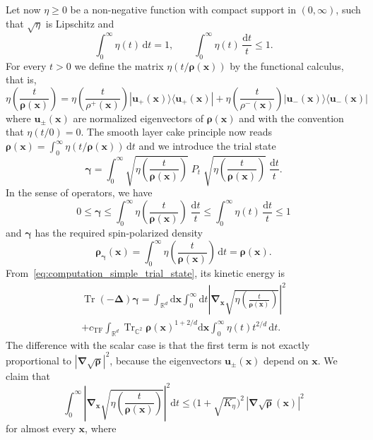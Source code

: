 \documentclass[final,reqno]{amsart}
\theoremstyle{remark}
\renewcommand{\le}{\leqslant}
\renewcommand{\ge}{\geqslant}
\DeclareMathOperator{\Tr}{Tr}
\newcommand{\Trs}{\Tr_{\CC^2}}
\newcommand{\RR}{\mathbb{R}}
\newcommand{\CC}{\mathbb{C}}
\newcommand{\TF}{\mathrm{TF}}
\newcommand{\lapl}{\bm{\Delta}}
\newcommand{\grad}{\bm{\nabla}}
\newcommand{\dd}{\mathrm{d}}
\begin{document}
Let now $\eta\ge0$ be a non-negative function with compact support in $(0,\infty)$, such that $\sqrt\eta$ is Lipschitz and
\begin{equation}\label{eq:cond_eta}
\int_0^\infty\eta(t)\,\dd t=1,\qquad \int_0^\infty\eta(t)\,\frac{\dd t}{t}\le1.
\end{equation}
For every $t>0$ we define the matrix $\eta(t/\bm{\rho}(\mathbf{x}))$ by the functional calculus, that is,
$$
\eta\left(\frac{t}{\bm{\rho}(\mathbf{x})}\right)=\eta\left(\frac{t}{\rho^+(\mathbf{x})}\right)|\mathbf{u}_+(\mathbf{x})\rangle\langle \mathbf{u}_+(\mathbf{x})|+\eta\left(\frac{t}{\rho^-(\mathbf{x})}\right)|\mathbf{u}_-(\mathbf{x})\rangle\langle \mathbf{u}_-(\mathbf{x})|
$$
where $\mathbf{u}_\pm(\mathbf{x})$ are normalized eigenvectors of $\bm{\rho}(\mathbf{x})$ and with the convention that $\eta(t/0)=0$. The smooth layer cake principle now reads $\bm{\rho}(\mathbf{x})=\int_0^\infty \eta(t/\bm{\rho}(\mathbf{x}))\,\dd t$ and we introduce the trial state
$$
\bm{\gamma}=\int_0^\infty  \sqrt{\eta\left(\frac{t}{\bm{\rho}(\mathbf{x})}\right)}\;P_t\;\sqrt{\eta\left(\frac{t}{\bm{\rho}(\mathbf{x})}\right)}\;\frac{\dd t}{t}.
$$
In the sense of operators, we have
$$
0\le \bm{\gamma}\le \int_0^\infty  \eta\left(\frac{t}{\bm{\rho}(\mathbf{x})}\right)\;\frac{\dd t}{t}\le\int_0^\infty\eta(t)\,\frac{\dd t}{t}\le1
$$
and $\bm{\gamma}$ has the required spin-polarized density
$$
\bm{\rho}_{\bm{\gamma}}(\mathbf{x})=\int_0^\infty  \eta\left(\frac{t}{\bm{\rho}(\mathbf{x})}\right)\,\dd t=\bm{\rho}(\mathbf{x}).
$$
From~\cref{eq:computation_simple_trial_state}, its kinetic energy is
\begin{multline}\label{eq:kinetic_trial}
\Tr(-\lapl)\bm{\gamma}=\int_{\RR^d}\dd \mathbf{x}\int_0^\infty \dd t  \left|\grad_{\mathbf{x}}\sqrt{\eta\left(\frac{t}{\bm{\rho}(\mathbf{x})}\right)}\right|^2\\
+c_\TF\int_{\RR^d}\Trs \bm{\rho}(\mathbf{x})^{1+2/d}\dd \mathbf{x}\int_0^\infty \eta(t)t^{2/d}\,\dd t.
\end{multline}
The difference with the scalar case is that the first term is not exactly proportional to $|\grad\sqrt{\bm{\rho}}|^2$, because the eigenvectors $\mathbf{u}_\pm(\mathbf{x})$ depend on $\mathbf{x}$. We claim that
\begin{equation}\label{eq:claim_gradient}
\int_0^\infty \left|\grad_{\mathbf{x}}\sqrt{\eta\left(\frac{t}{\bm{\rho}(\mathbf{x})}\right)}\right|^2\dd t\le \big(1+\sqrt{K_\eta}\big)^2\,|\grad\sqrt{\bm{\rho}}(\mathbf{x})|^2
\end{equation}
for almost every $\mathbf{x}$, where
\end{document}
